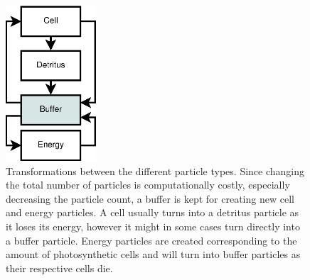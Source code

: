 \begin{figure}
  \centering
  \includegraphics[width=0.3\textwidth]{"figure/particle cycle"}
  \caption{Transformations between the different particle types. Since changing the total number of particles is computationally costly, especially decreasing the particle count, a buffer is kept for creating new cell and energy particles. A cell usually turns into a detritus particle as it loses its energy, however it might in some cases turn directly into a buffer particle. Energy particles are created corresponding to the amount of photosynthetic cells and will turn into buffer particles as their respective cells die.
  }
  \label{fig:particleCycle}
\end{figure}

